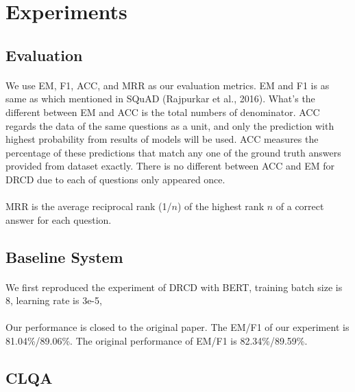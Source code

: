 \documentclass{article}
\begin{document}
\section{Experiments}
\paragraph{}

\subsection{Evaluation}
\paragraph{}
We use EM, F1, ACC, and MRR as our evaluation metrics. EM and F1 is as same as which mentioned in SQuAD\cite{rajpurkar2016squad} (Rajpurkar et al., 2016). What's the different between EM and ACC is the total numbers of denominator. ACC regards the data of the same questions as a unit, and only the prediction with highest probability from results of models will be used. ACC measures the percentage of these predictions that match any one of the ground truth answers provided from dataset exactly. There is no different between ACC and EM for DRCD due to each of questions only appeared once.

\paragraph{}
MRR is the average reciprocal rank (1/$n$) of the highest rank $n$ of a correct answer for each question.

\subsection{Baseline System}
\paragraph{}
We first reproduced the experiment of DRCD with BERT, training batch size is 8, learning rate is 3e-5,

\paragraph{}
Our performance is closed to the original paper. The EM/F1 of our experiment is 81.04\%/89.06\%. The original performance of EM/F1 is 82.34\%/89.59\%.

\subsection{CLQA}
\end{document}
